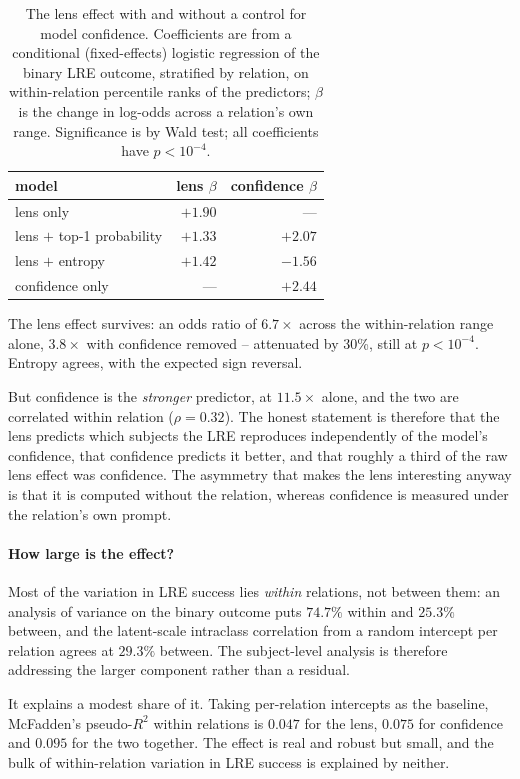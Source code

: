 \begin{table}[t]
\centering\small
\begin{tabular}{@{}lrr@{}}
\toprule
model & lens $\beta$ & confidence $\beta$ \\
\midrule
lens only & $+1.90$ & --- \\
lens $+$ top-1 probability & $+1.33$ & $+2.07$ \\
lens $+$ entropy & $+1.42$ & $-1.56$ \\
confidence only & --- & $+2.44$ \\
\bottomrule
\end{tabular}
\caption{The lens effect with and without a control for model confidence.
Coefficients are from a conditional (fixed-effects) logistic regression
of the binary LRE outcome, stratified by relation, on within-relation
percentile ranks of the predictors; $\beta$ is the change in log-odds
across a relation's own range. Significance is by Wald test; all
coefficients have $p < 10^{-4}$.}
\label{tab:conf}
\end{table}

The lens effect survives: an odds ratio of $6.7\times$ across the
within-relation range alone, $3.8\times$ with confidence removed
-- attenuated by 30\%, still at $p < 10^{-4}$. Entropy agrees, with the
expected sign reversal.

But confidence is the \emph{stronger} predictor, at $11.5\times$ alone,
and the two are correlated within relation ($\rho = 0.32$). The honest
statement is therefore that the lens predicts which subjects the LRE
reproduces independently of the model's confidence, that confidence
predicts it better, and that roughly a third of the raw lens effect was
confidence. The asymmetry that makes the lens interesting anyway is that
it is computed without the relation, whereas confidence is measured under
the relation's own prompt.

\paragraph{How large is the effect?} Most of the variation in LRE success
lies \emph{within} relations, not between them: an analysis of variance on
the binary outcome puts $74.7\%$ within and $25.3\%$ between, and the
latent-scale intraclass correlation from a random intercept per relation
agrees at $29.3\%$ between. The subject-level analysis is therefore
addressing the larger component rather than a residual.

It explains a modest share of it. Taking per-relation intercepts as the
baseline, McFadden's pseudo-$R^2$ within relations is $0.047$ for the lens,
$0.075$ for confidence and $0.095$ for the two together. The effect is
real and robust but small, and the bulk of within-relation variation in
LRE success is explained by neither.

